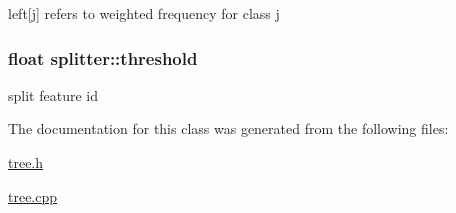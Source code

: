 left\mbox{[}j\mbox{]} refers to weighted frequency for class j \hypertarget{classsplitter_af40121f8411ad94f3f1968b1d50905ed}{
\subsubsection[{threshold}]{\setlength{\rightskip}{0pt plus 5cm}float splitter\+::threshold}}\label{classsplitter_af40121f8411ad94f3f1968b1d50905ed}
split feature id 

The documentation for this class was generated from the following files\+:\begin{DoxyCompactItemize}
\item 
\hyperlink{tree_8h}{tree.\+h}\item 
\hyperlink{tree_8cpp}{tree.\+cpp}\end{DoxyCompactItemize}
